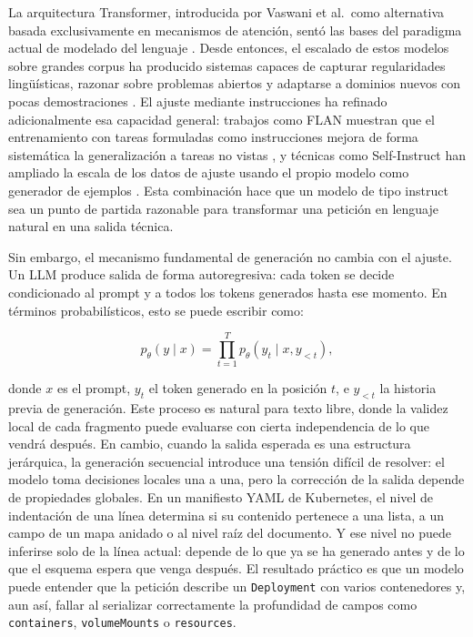 La arquitectura Transformer, introducida por Vaswani et al.\ como alternativa basada exclusivamente en mecanismos de atención, sentó las bases del paradigma actual de modelado del lenguaje \citep{vaswani2017attention}. Desde entonces, el escalado de estos modelos sobre grandes corpus ha producido sistemas capaces de capturar regularidades lingüísticas, razonar sobre problemas abiertos y adaptarse a dominios nuevos con pocas demostraciones \citep{zhao2023surveyllm}. El ajuste mediante instrucciones ha refinado adicionalmente esa capacidad general: trabajos como FLAN muestran que el entrenamiento con tareas formuladas como instrucciones mejora de forma sistemática la generalización a tareas no vistas \citep{wei2022scaling}, y técnicas como Self-Instruct han ampliado la escala de los datos de ajuste usando el propio modelo como generador de ejemplos \citep{wang2022selfinstruct}. Esta combinación hace que un modelo de tipo instruct sea un punto de partida razonable para transformar una petición en lenguaje natural en una salida técnica.

Sin embargo, el mecanismo fundamental de generación no cambia con el ajuste. Un LLM produce salida de forma autoregresiva: cada token se decide condicionado al prompt y a todos los tokens generados hasta ese momento. En términos probabilísticos, esto se puede escribir como:

\[
p_\theta(y \mid x) = \prod_{t=1}^{T} p_\theta(y_t \mid x, y_{<t}),
\]

donde \(x\) es el prompt, \(y_t\) el token generado en la posición \(t\), e \(y_{<t}\) la historia previa de generación. Este proceso es natural para texto libre, donde la validez local de cada fragmento puede evaluarse con cierta independencia de lo que vendrá después. En cambio, cuando la salida esperada es una estructura jerárquica, la generación secuencial introduce una tensión difícil de resolver: el modelo toma decisiones locales una a una, pero la corrección de la salida depende de propiedades globales. En un manifiesto YAML de Kubernetes, el nivel de indentación de una línea determina si su contenido pertenece a una lista, a un campo de un mapa anidado o al nivel raíz del documento. Y ese nivel no puede inferirse solo de la línea actual: depende de lo que ya se ha generado antes y de lo que el esquema espera que venga después. El resultado práctico es que un modelo puede entender que la petición describe un \texttt{Deployment} con varios contenedores y, aun así, fallar al serializar correctamente la profundidad de campos como \texttt{containers}, \texttt{volumeMounts} o \texttt{resources}.


